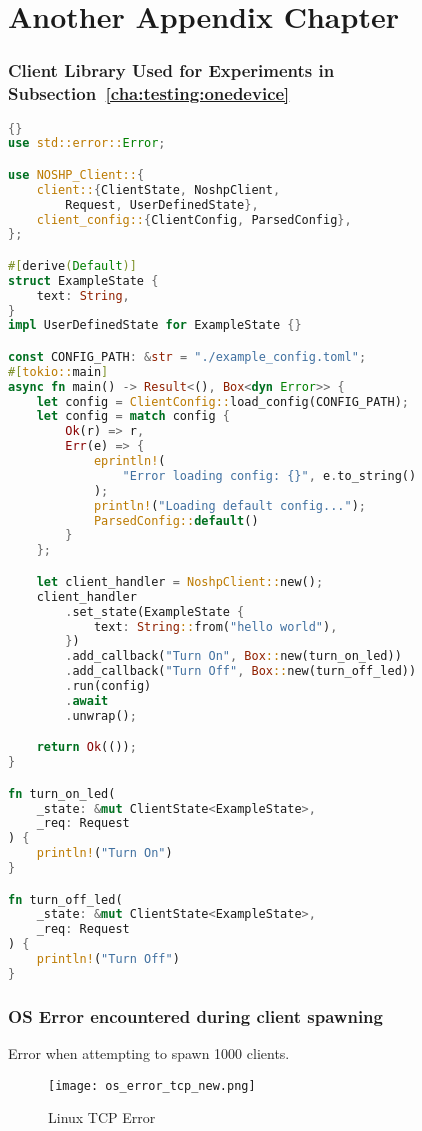
\chapter{Another Appendix Chapter}
\label{chap:A2}

\subsection{Client Library Used for Experiments in Subsection~\ref{cha:testing:onedevice}} \label{chap:A2:onedeviceclientlib}
\begin{lstlisting}[language=Rust, style=boxed, showstringspaces=false]{}
use std::error::Error;

use NOSHP_Client::{
    client::{ClientState, NoshpClient, 
        Request, UserDefinedState},
    client_config::{ClientConfig, ParsedConfig},
};

#[derive(Default)]
struct ExampleState {
    text: String,
}
impl UserDefinedState for ExampleState {}

const CONFIG_PATH: &str = "./example_config.toml";
#[tokio::main]
async fn main() -> Result<(), Box<dyn Error>> {
    let config = ClientConfig::load_config(CONFIG_PATH);
    let config = match config {
        Ok(r) => r,
        Err(e) => {
            eprintln!(
                "Error loading config: {}", e.to_string()
            );
            println!("Loading default config...");
            ParsedConfig::default()
        }
    };

    let client_handler = NoshpClient::new();
    client_handler
        .set_state(ExampleState {
            text: String::from("hello world"),
        })
        .add_callback("Turn On", Box::new(turn_on_led))
        .add_callback("Turn Off", Box::new(turn_off_led))
        .run(config)
        .await
        .unwrap();

    return Ok(());
}

fn turn_on_led(
    _state: &mut ClientState<ExampleState>,
    _req: Request
) {
    println!("Turn On")
}

fn turn_off_led(
    _state: &mut ClientState<ExampleState>,
    _req: Request
) {
    println!("Turn Off")
}
\end{lstlisting}


\subsection{OS Error encountered during client spawning} 
Error when attempting to spawn 1000 clients.
\label{chap:A2:oserror}
\begin{figure}[h]
\caption{Linux TCP Error}
\texttt{[image: os\_error\_tcp\_new.png]}
\label{fig:tcperror}
\end{figure}
